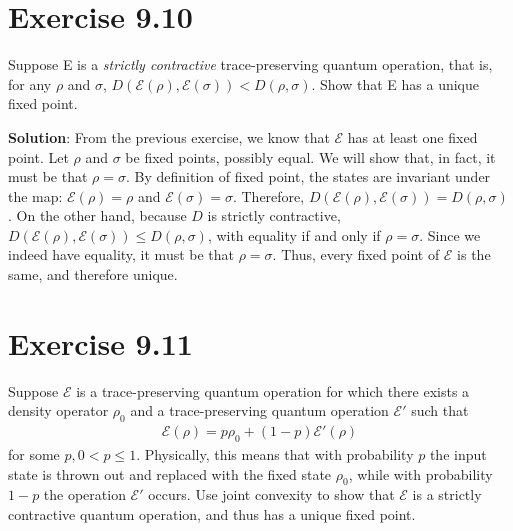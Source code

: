 \documentclass{book}
\newcommand{\mc}[1]{\mathcal{#1}}
\begin{document}
\section*{Exercise 9.10}
    Suppose E is a \emph{strictly contractive} trace-preserving quantum operation, that is, for any $\rho$ and $\sigma$, $D(\mc{E}(\rho), \mc{E}(\sigma)) < D(\rho, \sigma)$. Show that E has a unique fixed point.
    
    \textbf{Solution}: From the previous exercise, we know that $\mc{E}$ has at least one fixed point. Let $\rho$ and $\sigma$ be fixed points, possibly equal. We will show that, in fact, it must be that $\rho = \sigma$. By definition of fixed point, the states are invariant under the map: $\mc{E}(\rho) = \rho$ and $\mc{E}(\sigma) = \sigma$. Therefore, $D(\mc{E}(\rho),\mc{E}(\sigma)) = D(\rho, \sigma)$. On the other hand, because $D$ is strictly contractive, $D(\mc{E}(\rho), \mc{E}(\sigma)) \leq D(\rho, \sigma)$, with equality if and only if $\rho = \sigma$. Since we indeed have equality, it must be that $\rho = \sigma$. Thus, every fixed point of $\mc{E}$ is the same, and therefore unique.

\section*{Exercise 9.11}
    Suppose $\mc{E}$ is a trace-preserving quantum operation for which there exists a density operator $\rho_0$ and a trace-preserving quantum operation $\mc{E}'$ such that
    \begin{align}
        \mc{E}(\rho) = p\rho_0 + (1-p)\mc{E}'(\rho)
    \end{align}
    for some $p, 0 < p \leq 1$. Physically, this means that with probability $p$ the input state is thrown out and replaced with the fixed state $\rho_0$, while with probability $1 - p$ the operation $\mc{E}'$ occurs. Use joint convexity to show that $\mc{E}$ is a strictly contractive quantum operation, and thus has a unique fixed point.
    
\end{document}
